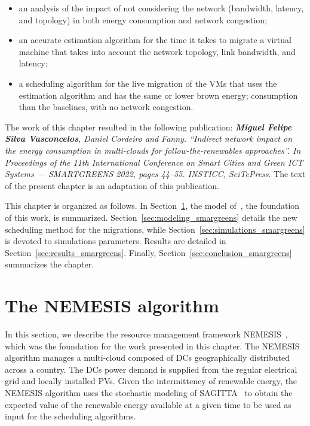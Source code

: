 \begin{itemize}
    \item an analysis of the impact of not considering the network (bandwidth, latency, and topology) in both energy consumption and network congestion;
    \item an accurate estimation algorithm for the time it takes to migrate a virtual machine that takes into account the network topology, link bandwidth, and latency;
    \item a scheduling algorithm for the live migration of the VMs that uses the estimation algorithm and has the same or lower brown energy; consumption than the baselines, with no network congestion.
\end{itemize}
    
The work of this chapter resulted in the following publication:  \textit{\textbf{Miguel Felipe Silva Vasconcelos}, Daniel Cordeiro and Fanny. ``Indirect network impact on the energy consumption in multi-clouds for follow-the-renewables approaches''. In Proceedings of the 11th International Conference on Smart Cities and Green ICT Systems — SMARTGREENS 2022, pages 44–55. INSTICC, SciTePress}. The text of the present chapter is an adaptation of this publication.

This chapter is organized as follows. In Section~\ref{sec:nemesis}, the model of~\citet{NEMESIS}, the foundation of this work, is summarized. Section~\ref{sec:modeling_smargreens} details the new scheduling method for the migrations, while Section~\ref{sec:simulations_smargreens} is devoted to simulations parameters. Results are detailed in Section~\ref{sec:results_smargreens}. Finally, Section~\ref{sec:conclusion_smargreens} summarizes the chapter.


\section{The NEMESIS algorithm}
\label{sec:nemesis}

In this section, we describe the resource management framework NEMESIS~\cite{NEMESIS}, which was the foundation for the work presented in this chapter. The NEMESIS algorithm manages a multi-cloud composed of DCs geographically distributed across a country. The DCs power demand is supplied from the regular electrical grid and locally installed PVs. Given the intermittency of renewable energy, the NEMESIS algorithm uses the stochastic modeling of SAGITTA~\cite{SAGITTA} to obtain the expected value of the renewable energy available at a given time to be used as input for the scheduling algorithms.

